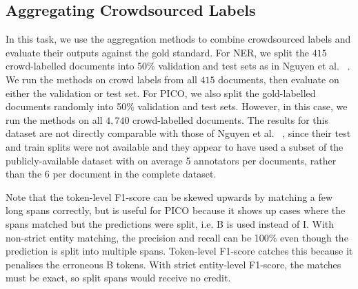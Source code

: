 \subsection{Aggregating Crowdsourced Labels}

In this task, we use the aggregation methods to combine crowdsourced labels and evaluate their outputs against the gold standard.
For NER, we split the $415$ crowd-labelled documents into 50\% validation and test sets as in Nguyen et al. ~. We run the methods on crowd labels from all $415$ documents, then evaluate on either the
validation or test set.
For PICO, we also split the gold-labelled documents randomly into 50\% validation and test sets. However, in this case, we run the methods on all $4,740$ crowd-labelled documents. The results for this dataset are not directly comparable
with those of Nguyen et al. ~, since their test and train splits were not available 
and they appear to have used a subset of the publicly-available dataset with on average 5 annotators per documents, rather than the 6 per document in the complete dataset.





Note that the token-level F1-score can be skewed upwards by matching a few long spans correctly, but is useful for PICO because it shows up cases where the spans matched but the predictions were split, i.e. B is used instead of I. With non-strict entity matching, the precision and recall can be 100\% even though the prediction is split into multiple spans.
Token-level F1-score catches this because it penalises the erroneous B tokens. With strict entity-level F1-score, the matches must be exact, so split spans would receive no credit.

